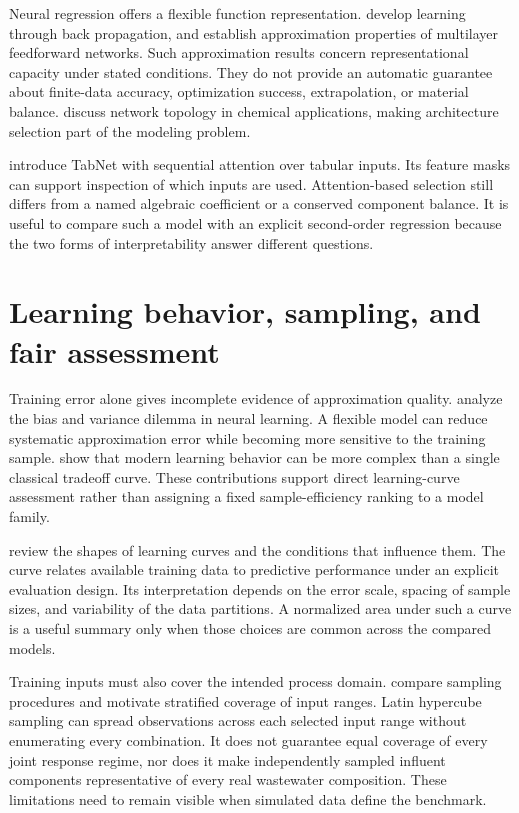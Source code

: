 Neural regression offers a flexible function representation. \citet{Rumelhart1986} develop learning through back propagation, and \citet{Hornik1989} establish approximation properties of multilayer feedforward networks. Such approximation results concern representational capacity under stated conditions. They do not provide an automatic guarantee about finite-data accuracy, optimization success, extrapolation, or material balance. \citet{Curteanu2011} discuss network topology in chemical applications, making architecture selection part of the modeling problem.

\citet{ArikPfister2021} introduce TabNet with sequential attention over tabular inputs. Its feature masks can support inspection of which inputs are used. Attention-based selection still differs from a named algebraic coefficient or a conserved component balance. It is useful to compare such a model with an explicit second-order regression because the two forms of interpretability answer different questions.

\section{Learning behavior, sampling, and fair assessment}

Training error alone gives incomplete evidence of approximation quality. \citet{Geman1992} analyze the bias and variance dilemma in neural learning. A flexible model can reduce systematic approximation error while becoming more sensitive to the training sample. \citet{Belkin2019} show that modern learning behavior can be more complex than a single classical tradeoff curve. These contributions support direct learning-curve assessment rather than assigning a fixed sample-efficiency ranking to a model family.

\citet{VieringLoog2023} review the shapes of learning curves and the conditions that influence them. The curve relates available training data to predictive performance under an explicit evaluation design. Its interpretation depends on the error scale, spacing of sample sizes, and variability of the data partitions. A normalized area under such a curve is a useful summary only when those choices are common across the compared models.

Training inputs must also cover the intended process domain. \citet{McKay1979} compare sampling procedures and motivate stratified coverage of input ranges. Latin hypercube sampling can spread observations across each selected input range without enumerating every combination. It does not guarantee equal coverage of every joint response regime, nor does it make independently sampled influent components representative of every real wastewater composition. These limitations need to remain visible when simulated data define the benchmark.

